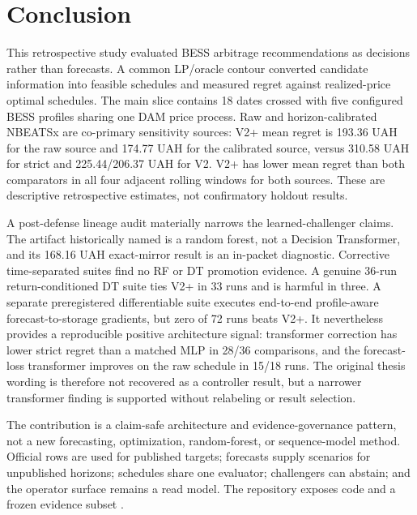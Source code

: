 \section{Conclusion}

This retrospective study evaluated BESS arbitrage recommendations as decisions rather than forecasts. A common LP/oracle contour converted candidate information into feasible schedules and measured regret against realized-price optimal schedules. The main slice contains 18 dates crossed with five configured BESS profiles sharing one DAM price process. Raw and horizon-calibrated NBEATSx are co-primary sensitivity sources: V2+ mean regret is 193.36 UAH for the raw source and 174.77 UAH for the calibrated source, versus 310.58 UAH for strict and 225.44/206.37 UAH for V2. V2+ has lower mean regret than both comparators in all four adjacent rolling windows for both sources. These are descriptive retrospective estimates, not confirmatory holdout results.

A post-defense lineage audit materially narrows the learned-challenger claims. The artifact historically named  is a random forest, not a Decision Transformer, and its 168.16 UAH exact-mirror result is an in-packet diagnostic. Corrective time-separated suites find no RF or DT promotion evidence. A genuine 36-run return-conditioned DT suite ties V2+ in 33 runs and is harmful in three. A separate preregistered differentiable suite executes end-to-end profile-aware forecast-to-storage gradients, but zero of 72 runs beats V2+. It nevertheless provides a reproducible positive architecture signal: transformer correction has lower strict regret than a matched MLP in 28/36 comparisons, and the forecast-loss transformer improves on the raw schedule in 15/18 runs. The original thesis wording is therefore not recovered as a controller result, but a narrower transformer finding is supported without relabeling or result selection.

The contribution is a claim-safe architecture and evidence-governance pattern, not a new forecasting, optimization, random-forest, or sequence-model method. Official rows are used for published targets; forecasts supply scenarios for unpublished horizons; schedules share one evaluator; challengers can abstain; and the operator surface remains a read model. The repository exposes code and a frozen evidence subset \cite{fefelov2026repo}.
